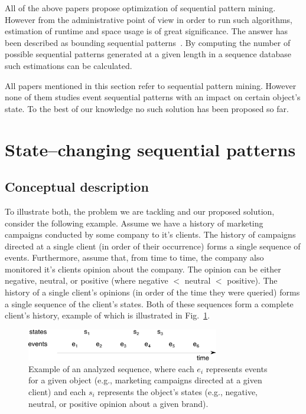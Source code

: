 \documentclass[runningheads,a4paper]{llncs}
\begin{document}
All of the above papers propose optimization of sequential pattern mining.
However from the administrative point of view in order to run such algorithms, estimation of runtime and space usage is of great significance.
The answer has been described as bounding sequential patterns~\cite{Raissi:2011}.
By computing the number of possible sequential patterns generated at a given length in a sequence database such estimations can be calculated.

All papers mentioned in this section refer to sequential pattern mining.
However none of them studies event sequential patterns with an impact on certain object’s state.
To the best of our knowledge no such solution has been proposed so far.

\section{State--changing sequential patterns}
\label{sec:main}

\subsection{Conceptual description}
To illustrate both, the problem we are tackling and our proposed solution, consider the following example.
Assume we have a history of marketing campaigns conducted by some company to it's clients.
The history of campaigns directed at a single client (in order of their occurrence) forms a single sequence of events.
Furthermore, assume that, from time to time, the company also monitored it's clients opinion about the company.
The opinion can be either negative, neutral, or positive (where negative $<$ neutral $<$ positive).
The history of a single client's opinions (in order of the time they were queried) forms a single sequence of the client's states.
Both of these sequences form a complete client's history, example of which is illustrated in Fig.~\ref{fig:example}.

\begin{figure}[!ht]
	\centering
		\includegraphics[width=0.75\textwidth]{images/example}
	\caption{Example of an analyzed sequence, where each $e_i$ represents events for a given object (e.g., marketing campaigns directed at a given client) and each $s_i$ represents the object's states (e.g., negative, neutral, or positive opinion about a given brand).}
	\label{fig:example}
\end{figure}
\end{document}
